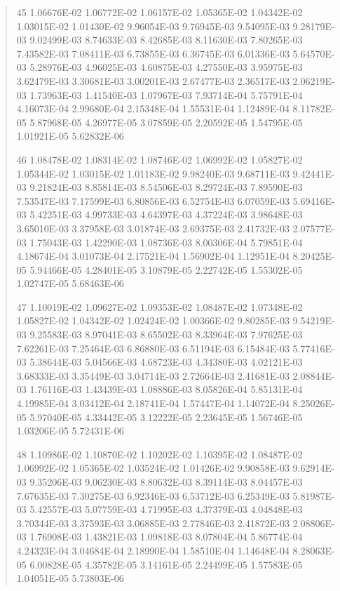 \documentclass[letterpaper,10pt,english]{sphinxmanual}
\begin{document}
\begin{quote}
\begin{DUlineblock}{0em}
\item[] 45   1.06676E-02  1.06772E-02  1.06157E-02  1.05365E-02  1.04342E-02  1.03015E-02  1.01430E-02  9.96054E-03  9.76945E-03  9.54095E-03  9.28179E-03  9.02499E-03  8.74633E-03  8.42685E-03  8.11630E-03  7.80265E-03  7.43582E-03  7.08411E-03  6.73855E-03  6.36745E-03  6.01336E-03  5.64570E-03  5.28976E-03  4.96025E-03  4.60875E-03  4.27550E-03  3.95975E-03  3.62479E-03  3.30681E-03  3.00201E-03  2.67477E-03  2.36517E-03  2.06219E-03  1.73963E-03  1.41540E-03  1.07967E-03  7.93714E-04  5.75791E-04  4.16073E-04  2.99680E-04  2.15348E-04  1.55531E-04  1.12489E-04  8.11782E-05  5.87968E-05  4.26977E-05  3.07859E-05  2.20592E-05  1.54795E-05  1.01921E-05  5.62832E-06
\item[] 46   1.08478E-02  1.08314E-02  1.08746E-02  1.06992E-02  1.05827E-02  1.05344E-02  1.03015E-02  1.01183E-02  9.98240E-03  9.68711E-03  9.42441E-03  9.21824E-03  8.85814E-03  8.54506E-03  8.29724E-03  7.89590E-03  7.53547E-03  7.17599E-03  6.80856E-03  6.52754E-03  6.07059E-03  5.69416E-03  5.42251E-03  4.99733E-03  4.64397E-03  4.37224E-03  3.98648E-03  3.65010E-03  3.37958E-03  3.01874E-03  2.69375E-03  2.41732E-03  2.07577E-03  1.75043E-03  1.42290E-03  1.08736E-03  8.00306E-04  5.79851E-04  4.18674E-04  3.01073E-04  2.17521E-04  1.56902E-04  1.12951E-04  8.20425E-05  5.94466E-05  4.28401E-05  3.10879E-05  2.22742E-05  1.55302E-05  1.02747E-05  5.68463E-06
\item[] 47   1.10019E-02  1.09627E-02  1.09353E-02  1.08487E-02  1.07348E-02  1.05827E-02  1.04342E-02  1.02424E-02  1.00366E-02  9.80285E-03  9.54219E-03  9.25583E-03  8.97041E-03  8.65502E-03  8.33964E-03  7.97625E-03  7.62261E-03  7.25464E-03  6.86880E-03  6.51194E-03  6.15484E-03  5.77416E-03  5.38644E-03  5.04566E-03  4.68723E-03  4.34380E-03  4.02121E-03  3.68333E-03  3.35449E-03  3.04714E-03  2.72664E-03  2.41681E-03  2.08844E-03  1.76116E-03  1.43439E-03  1.08886E-03  8.05826E-04  5.85131E-04  4.19985E-04  3.03412E-04  2.18741E-04  1.57447E-04  1.14072E-04  8.25026E-05  5.97040E-05  4.33442E-05  3.12222E-05  2.23645E-05  1.56746E-05  1.03206E-05  5.72431E-06
\item[] 48   1.10986E-02  1.10870E-02  1.10202E-02  1.10395E-02  1.08487E-02  1.06992E-02  1.05365E-02  1.03524E-02  1.01426E-02  9.90858E-03  9.62914E-03  9.35206E-03  9.06230E-03  8.80632E-03  8.39114E-03  8.04457E-03  7.67635E-03  7.30275E-03  6.92346E-03  6.53712E-03  6.25349E-03  5.81987E-03  5.42557E-03  5.07759E-03  4.71995E-03  4.37379E-03  4.04848E-03  3.70344E-03  3.37593E-03  3.06885E-03  2.77846E-03  2.41872E-03  2.08806E-03  1.76908E-03  1.43821E-03  1.09818E-03  8.07804E-04  5.86774E-04  4.24323E-04  3.04684E-04  2.18990E-04  1.58510E-04  1.14648E-04  8.28063E-05  6.00828E-05  4.35782E-05  3.14161E-05  2.24499E-05  1.57583E-05  1.04051E-05  5.73803E-06

\end{DUlineblock}
\end{quote}
\end{document}
